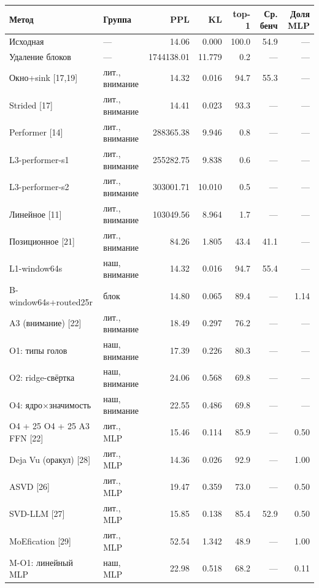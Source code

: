 \begin{tabular}{llrrrrr}
\toprule
Метод & Группа & PPL & KL & top-1 & Ср. бенч & Доля MLP \\
\midrule
Исходная & — & 14.06 & 0.000 & 100.0 & 54.9 & — \\
Удаление блоков & — & 1744138.01 & 11.779 & 0.2 & — & — \\
Окно+sink [17,19] & лит., внимание & 14.32 & 0.016 & 94.7 & 55.3 & — \\
Strided [17] & лит., внимание & 14.41 & 0.023 & 93.3 & — & — \\
Performer [14] & лит., внимание & 288365.38 & 9.946 & 0.8 & — & — \\
L3-performer-s1 & лит., внимание & 255282.75 & 9.838 & 0.6 & — & — \\
L3-performer-s2 & лит., внимание & 303001.71 & 10.010 & 0.5 & — & — \\
Линейное [11] & лит., внимание & 103049.56 & 8.964 & 1.7 & — & — \\
Позиционное [21] & лит., внимание & 84.26 & 1.805 & 43.4 & 41.1 & — \\
L1-window64s & наш, внимание & 14.32 & 0.016 & 94.7 & 55.4 & — \\
B-window64s+routed25r & блок & 14.80 & 0.065 & 89.4 & — & 1.14 \\
A3 (внимание) [22] & лит., внимание & 18.49 & 0.297 & 76.2 & — & — \\
O1: типы голов & наш, внимание & 17.39 & 0.226 & 80.3 & — & — \\
O2: ridge-свёртка & наш, внимание & 24.06 & 0.568 & 69.8 & — & — \\
O4: ядро×значимость & наш, внимание & 22.55 & 0.486 & 69.8 & — & — \\
O4 + 25%
O4 + 25%
A3 FFN [22] & лит., MLP & 15.46 & 0.114 & 85.9 & — & 0.50 \\
Deja Vu (оракул) [28] & лит., MLP & 14.36 & 0.026 & 92.9 & — & 1.00 \\
ASVD [26] & лит., MLP & 19.47 & 0.359 & 73.0 & — & 0.50 \\
SVD-LLM [27] & лит., MLP & 15.85 & 0.138 & 85.4 & 52.9 & 0.50 \\
MoEfication [29] & лит., MLP & 52.54 & 1.342 & 48.9 & — & 1.00 \\
M-O1: линейный MLP & наш, MLP & 22.98 & 0.518 & 68.2 & — & 0.11 \\

\end{tabular}

